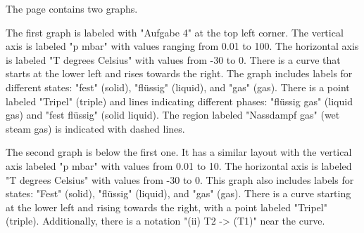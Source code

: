The page contains two graphs.

The first graph is labeled with "Aufgabe 4" at the top left corner. The vertical axis is labeled "p mbar" with values ranging from 0.01 to 100. The horizontal axis is labeled "T degrees Celsius" with values from -30 to 0. There is a curve that starts at the lower left and rises towards the right. The graph includes labels for different states: "fest" (solid), "flüssig" (liquid), and "gas" (gas). There is a point labeled "Tripel" (triple) and lines indicating different phases: "flüssig gas" (liquid gas) and "fest flüssig" (solid liquid). The region labeled "Nassdampf gas" (wet steam gas) is indicated with dashed lines.

The second graph is below the first one. It has a similar layout with the vertical axis labeled "p mbar" with values from 0.01 to 10. The horizontal axis is labeled "T degrees Celsius" with values from -30 to 0. This graph also includes labels for states: "Fest" (solid), "flüssig" (liquid), and "gas" (gas). There is a curve starting at the lower left and rising towards the right, with a point labeled "Tripel" (triple). Additionally, there is a notation "(ii) T2 -> (T1)" near the curve.